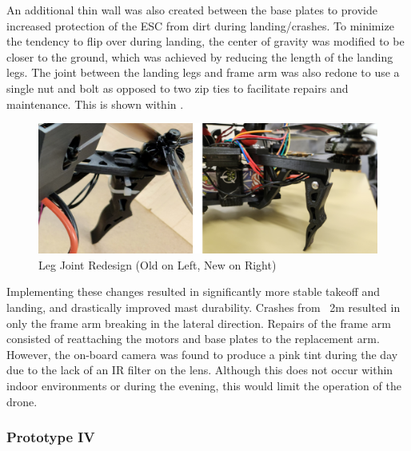 \documentclass{article}
\begin{document}
\clearpage

An additional thin wall was also created between the base plates to provide increased protection of the ESC from dirt during landing/crashes.
To minimize the tendency to flip over during landing, the center of gravity was modified to be closer to the ground, which was achieved by reducing the length of the landing legs. The joint between the landing legs and frame arm was also redone to use a single nut and bolt as opposed to two zip ties to facilitate repairs and maintenance. This is shown within .

\begin{figure}[h!]
  \begin{center} 
  \caption{Leg Joint Redesign (Old on Left, New on Right)}
  \label{fig:legJoint}
        \includegraphics[width=1\textwidth]{Reflection/LegJoint.png}
  \end{center}
\end{figure}

Implementing these changes resulted in significantly more stable takeoff and landing, and drastically improved mast durability. Crashes from ~2m resulted in only the frame arm breaking in the lateral direction. Repairs of the frame arm consisted of reattaching the motors and base plates to the replacement arm. 
However, the on-board camera was found to produce a pink tint during the day due to the lack of an IR filter on the lens. Although this does not occur within indoor environments or during the evening, this would limit the operation of the drone.

\clearpage

\subsubsection{Prototype IV}
\end{document}
